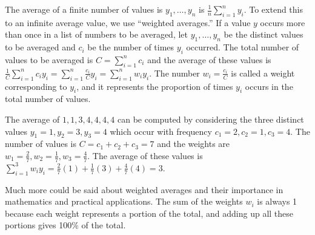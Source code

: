 The average of a finite number of values is $y_1,\ldots,y_n$ is
$\frac{1}{n}\sum_{i=1}^n y_i$. To extend this to an infinite average
value, we use ``weighted averages.'' If a value $y$ occurs more than
once in a list of numbers to be averaged, let $y_1,\ldots,y_n$ be the
distinct values to be averaged and $c_i$ be the number of times $y_i$
occurred. The total number of values to be averaged is $C=\sum_{i=1}^n
c_i$ and the average of these values is $\frac{1}{C}\sum_{i=1}^n c_iy_i =
\sum_{i=1}^n \frac{c_i}{C}y_i = \sum_{i=1}^n w_i y_i$. The number
$w_i=\frac{c_i}{C}$ is called a weight corresponding to $y_i$, and it
represents the proportion of times $y_i$ occurs in the total number of
values. 

\begin{example}
 The average of $1,1,3,4,4,4,4$ can be computed by
  considering the three distinct values $y_1=1, y_2=3, y_3=4$ which
  occur with frequency $c_1=2, c_2=1, c_3=4$. The number of values is
  $C=c_1+c_2+c_3=7$ and the weights are
  $w_1=\frac{2}{7},w_2=\frac{1}{7},w_3=\frac{4}{7}$.  The average of
  these values is $\sum_{i=1}^3 w_i y_i =
  \frac{2}{7}(1)+\frac{1}{7}(3)+\frac{4}{7}(4) = 3$.

\end{example}

Much more could be
said about weighted averages and their importance in mathematics and
practical applications. The sum of the weights $w_i$ is always 1
because each weight represents a portion of the total, and adding up
all these portions gives 100\% of the total.

